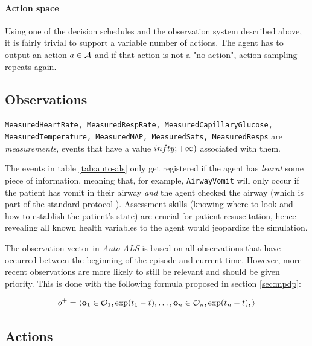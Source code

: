 \paragraph{Action space}

Using one of the decision schedules and the observation system described above, it is fairly trivial to support a variable number of actions. 
The agent has to output an action $a \in \mathcal{A}$ and if that action is not a "no action", action sampling repeats again.

\newpage
\subsection{Observations}
\label{sec:auto-als-obs}

\texttt{MeasuredHeartRate, MeasuredRespRate, MeasuredCapillaryGlucose, MeasuredTemperature, MeasuredMAP, MeasuredSats, MeasuredResps} are \emph{measurements}, events that have a value $\-infty; +\infty)$ associated with them.

The events in table \ref{tab:auto-als} only get registered if the agent has \emph{learnt} some piece of information, meaning that, for example, \verb|AirwayVomit| will only occur if the patient has vomit in their airway \emph{and} the agent checked the airway (which is part of the standard protocol \cite{thimInitialAssessmentTreatment2012}).
Assessment skills (knowing where to look and how to establish the patient's state) are crucial for patient resuscitation, hence revealing all known health variables to the agent would jeopardize the simulation.

The observation vector in \emph{Auto-ALS} is based on all observations that have occurred between the beginning of the episode and current time.
However, more recent observations are more likely to still be relevant and should be given priority.
This is done with the following formula proposed in section \ref{sec:mpdp}:

\begin{equation}
     o^{+} = \langle \mathbf{o}_1 \in \mathcal{O}_1, \exp(t_1-t), \dots, \mathbf{o}_n \in \mathcal{O}_n, \exp(t_n-t), \rangle
\end{equation}

\newpage
\subsection{Actions}
\label{sec:auto-als-act}

